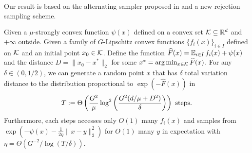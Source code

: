 Our result is based on the alternating sampler proposed in \cite{LST21} and a new rejection sampling scheme.

\begin{theorem}
Given a $\mu$-strongly convex function $\psi(x)$ defined on a convex set $\mathcal K \subseteq \mathbb{R}^{d}$ and $+\infty$ outside. Given a family of $G$-Lipschitz convex functions $\{f_{i}(x)\}_{i\in I}$ defined on $\mathcal K$ and an initial point $x_0\in \mathcal K$.
Define the function $\widehat{F}(x)=\operatorname*{\mathbb{E}}_{i\in I}f_{i}(x)+\psi(x)$ and 
the distance $D=\|x_{0}-x^{*}\|_{2}$ for some $x^{*}=\arg\min_{x\in\mathcal K}\widehat{F}(x)$.
For any $\delta\in(0,1/2)$, we can generate a random point $x$ that
has $\delta$ total variation distance to the distribution proportional to $\exp(-\widehat{F}(x))$ in
\[
T:=\Theta\left(\frac{G^{2}}{\mu}\log^{2}\left(\frac{G^{2}(d/\mu+D^{2})}{\delta}\right)\right)\text{ steps}.
\]
Furthermore, each steps accesses only $O(1)$ many $f_{i}(x)$ and samples from $\exp(-\psi(x) - \frac{1}{2\eta} \|x-y\|^2_2)$ for $O(1)$ many $y$
in expectation with $\eta = \Theta(G^{-2}/\log(T/\delta))$.
\end{theorem}



